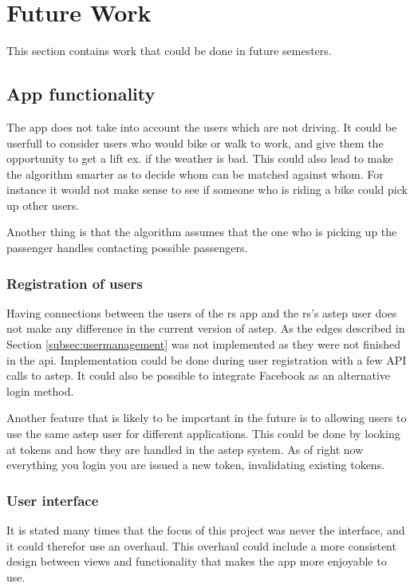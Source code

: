 \section{Future Work}\label{sec:future}
This section contains work that could be done in future semesters.

\subsection{App functionality}
The app does not take into account the users which are not driving.
It could be userfull to consider users who would bike or walk to work, and give them the opportunity to get a lift ex. if the weather is bad.
This could also lead to make the algorithm smarter as to decide whom can be matched against whom.
For instance it would not make sense to see if someone who is riding a bike could pick up other users.

Another thing is that the algorithm assumes that the one who is picking up the passenger handles contacting possible passengers.

\subsubsection*{Registration of users}
Having connections between the users of the \gls{rs} app and the \gls{rs}'s \gls{astep} user does not make any difference in the current version of \gls{astep}.
As the edges described in Section \ref{subsec:usermanagement} was not implemented as they were not finished in the api.
Implementation could be done during user registration with a few API calls to \gls{astep}.
It could also be possible to integrate Facebook as an alternative login method.

Another feature that is likely to be important in the future is to allowing users to use the same \gls{astep} user for different applications.
This could be done by looking at tokens and how they are handled in the \gls{astep} system.
As of right now everything you login you are issued a new token, invalidating existing tokens.

\subsubsection*{User interface}
It is stated many times that the focus of this project was never the interface, and it could therefor use an overhaul.
This overhaul could include a more consistent design between views and functionality that makes the app more enjoyable to use.

